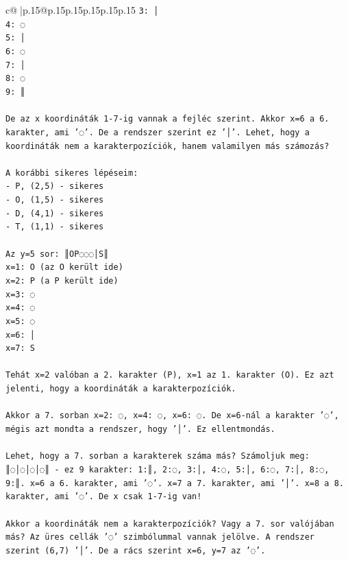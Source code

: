 \documentclass{article}
\begin{document}
{\begin{supertabular}{c@{$\;$}|p{.15\linewidth}@{}p{.15\linewidth}p{.15\linewidth}p{.15\linewidth}p{.15\linewidth}p{.15\linewidth}}
{{{\texttt{3: │} \\
\texttt{4: ◌} \\
\texttt{5: │} \\
\texttt{6: ◌} \\
\texttt{7: │} \\
\texttt{8: ◌} \\
\texttt{9: ║} \\
\\ 
\texttt{De az x koordináták 1{-}7{-}ig vannak a fejléc szerint. Akkor x=6 a 6. karakter, ami '◌'. De a rendszer szerint ez '│'. Lehet, hogy a koordináták nem a karakterpozíciók, hanem valamilyen más számozás?} \\
\\ 
\texttt{A korábbi sikeres lépéseim:} \\
\texttt{{-} P, (2,5) {-} sikeres} \\
\texttt{{-} O, (1,5) {-} sikeres} \\
\texttt{{-} D, (4,1) {-} sikeres} \\
\texttt{{-} T, (1,1) {-} sikeres} \\
\\ 
\texttt{Az y=5 sor: ║OP◌◌◌│S║} \\
\texttt{x=1: O (az O került ide)} \\
\texttt{x=2: P (a P került ide)} \\
\texttt{x=3: ◌} \\
\texttt{x=4: ◌} \\
\texttt{x=5: ◌} \\
\texttt{x=6: │} \\
\texttt{x=7: S} \\
\\ 
\texttt{Tehát x=2 valóban a 2. karakter (P), x=1 az 1. karakter (O). Ez azt jelenti, hogy a koordináták a karakterpozíciók.} \\
\\ 
\texttt{Akkor a 7. sorban x=2: ◌, x=4: ◌, x=6: ◌. De x=6{-}nál a karakter '◌', mégis azt mondta a rendszer, hogy '│'. Ez ellentmondás.} \\
\\ 
\texttt{Lehet, hogy a 7. sorban a karakterek száma más? Számoljuk meg: ║◌│◌│◌│◌║ {-} ez 9 karakter: 1:║, 2:◌, 3:│, 4:◌, 5:│, 6:◌, 7:│, 8:◌, 9:║. x=6 a 6. karakter, ami '◌'. x=7 a 7. karakter, ami '│'. x=8 a 8. karakter, ami '◌'. De x csak 1{-}7{-}ig van!} \\
\\ 
\texttt{Akkor a koordináták nem a karakterpozíciók? Vagy a 7. sor valójában más? Az üres cellák '◌' szimbólummal vannak jelölve. A rendszer szerint (6,7) '│'. De a rács szerint x=6, y=7 az '◌'.} \\
}}}
\end{supertabular}}
\end{document}

